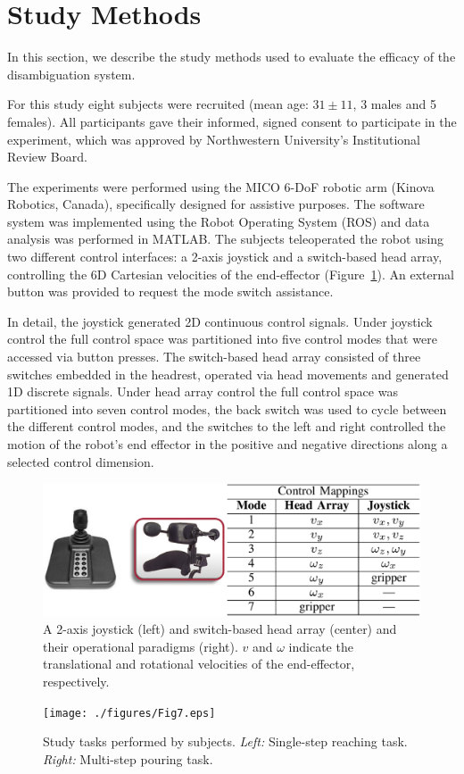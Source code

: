 \documentclass[journal]{IEEEtran}
\begin{document}
\section{Study Methods}\label{sec:study_methods}
In this section, we describe the study methods used to evaluate the efficacy of the disambiguation system. 

 For this study eight subjects were recruited (mean age: $31 \pm 11$, 3 males and 5 females). All participants gave their informed, signed consent to participate in the experiment, which was approved by Northwestern University's Institutional Review Board.

 The experiments were performed using the MICO 6-DoF robotic arm (Kinova Robotics, Canada), specifically designed for assistive purposes. The software system was implemented using the Robot Operating System (ROS) and data analysis was performed in MATLAB. 
The subjects teleoperated the robot using two different control interfaces: a 2-axis joystick and a switch-based head array, controlling the 6D Cartesian velocities of the end-effector (Figure~\ref{fig:interfaces}). An external button was provided to request the mode switch assistance. 

In detail, the joystick generated 2D continuous control signals. Under joystick control the full control space was partitioned into five control modes that were accessed via button presses. 	
The switch-based head array consisted of three switches embedded in the headrest, operated via head movements and generated 1D discrete signals. Under head array control the full control space was partitioned into seven control modes, the back switch was used to cycle between the different control modes, and the switches to the left and right controlled the motion of the robot's end effector in the positive and negative directions along a selected control dimension.
\begin{figure}[b]
	\centering
	\includegraphics[width = 1\hsize]{./figures/Fig6_New.eps}
	\caption{A 2-axis joystick (left) and switch-based head array (center) and their operational paradigms (right). $v$ and $\omega$ indicate the translational and rotational velocities of the end-effector, respectively. }
	\label{fig:interfaces}
\end{figure}
\begin{figure}[ht!]
	\texttt{[image: ./figures/Fig7.eps]}
	\caption{Study tasks performed by subjects. \textit{Left:} Single-step reaching task. \textit{Right:} Multi-step pouring task. }
	\label{fig:tasks}
\end{figure}
\end{document}

